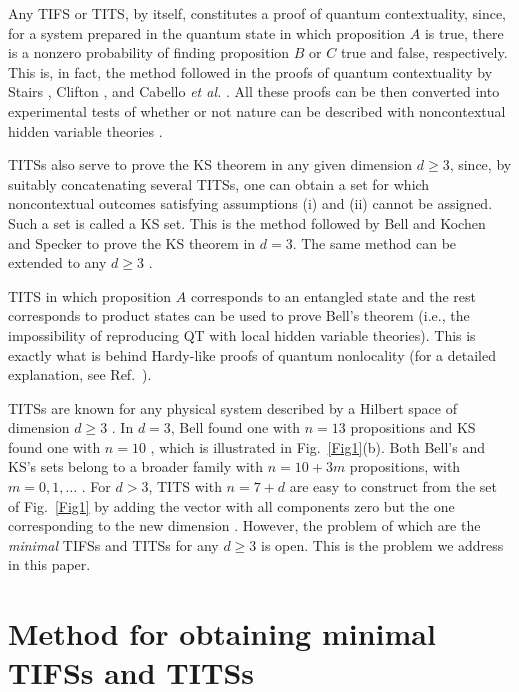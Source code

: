 \documentclass[%
 twocolumn,
 groupedaddress,
 showpacs,
 showkeys,
 preprintnumbers,
 amsmath,amssymb,
 aps,
 pra,
 longbibliography,
 floatfix,
 ]{revtex4-1}
\begin{document}

Any TIFS or TITS, by itself, constitutes a proof of quantum contextuality, since, for a system prepared in the quantum state in which proposition $A$ is true, there is a nonzero probability of finding proposition $B$ or $C$ true and false, respectively. This is, in fact, the method followed in the proofs of quantum contextuality by Stairs \cite{Stairs83}, Clifton \cite{Clifton93}, and Cabello {\em et al.} \cite{CG95,CBTB13}. All these proofs can be then converted into experimental tests of whether or not nature can be described with noncontextual hidden variable theories \cite{CT11}.

TITSs also serve to prove the KS theorem in any given dimension $d \ge 3$, since, by suitably concatenating several TITSs, one can obtain a set for which noncontextual outcomes satisfying assumptions (i) and (ii) cannot be assigned. Such a set is called a KS set. This is the method followed by Bell \cite{Bell64} and Kochen and Specker \cite{KS67} to prove the KS theorem in $d=3$. The same method can be extended to any $d \ge 3$ \cite{CG96}.

TITS in which proposition $A$ corresponds to an entangled state and the rest corresponds to product states can be used to prove Bell's theorem (i.e., the impossibility of reproducing QT with local hidden variable theories). This is exactly what is behind Hardy-like proofs of quantum nonlocality \cite{Hardy93} (for a detailed explanation, see Ref.~\cite{CEG96}).

TITSs are known for any physical system described by a Hilbert space of dimension $d \ge 3$ \cite{KS65, Bell66}. In $d=3$, Bell found one with $n= 13$ propositions \cite{Bell66} and KS found one with $n=10$ \cite{KS67}, which is illustrated in Fig.~\ref{Fig1}(b). Both Bell's and KS's sets belong to a broader family with $n=10+3m$ propositions, with $m=0,1,\ldots$ \cite{CG95}. For $d>3$, TITS with $n=7+d$ are easy to construct from the set of Fig.~\ref{Fig1} by adding the vector with all components zero but the one corresponding to the new dimension \cite{CG95}. However, the problem of which are the {\em minimal} TIFSs and TITSs for any $d \ge 3$ is open. This is the problem we address in this paper.


\section{Method for obtaining minimal TIFSs and TITSs}
\end{document}
